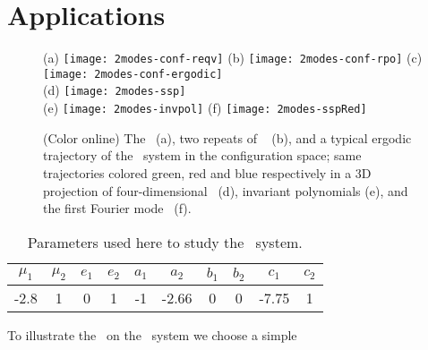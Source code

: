 \section{Applications}
\label{s:numerics}

\begin{figure}%
\centering
 (a) \texttt{[image: 2modes-conf-reqv]} %
 (b) \texttt{[image: 2modes-conf-rpo]} %
 (c) \texttt{[image: 2modes-conf-ergodic]} \\ %
 (d) \texttt{[image: 2modes-ssp]} \\ %
 (e) \texttt{[image: 2modes-invpol]} %
 (f) \texttt{[image: 2modes-sspRed]} %
\caption{(Color online) 
The \reqv\ (a), two repeats of \rpo\  (b), and a typical
ergodic trajectory of the \twomode\ system in the configuration
space; same trajectories colored green, red and blue respectively 
in a 3D projection of four-dimensional \statesp\ (d), invariant 
polynomials (e), and the first Fourier mode \slicePlane\ (f).}
\label{fig:Set1}
\end{figure}
\begin{table}
	\caption{Parameters used here to study the \twomode\ system.}
	\begin{tabular}{c|c|c|c|c|c|c|c|c|c}
	 $\mu_1$ & $\mu_2$ & $e_1$ & $e_2$ & $a_1$ & $a_2$ & $b_1$ & $b_2$ & $c_1$ & $c_2$ \\
	\hline   
	 -2.8	& 1		  & 0	  & 1	  & -1	  & -2.66 & 0	  & 0 	  & -7.75 & 1	  \\
	\end{tabular}
	\label{tab:pars}
\end{table}
To illustrate the \mslices\ on the \twomode\ system we choose a simple 
